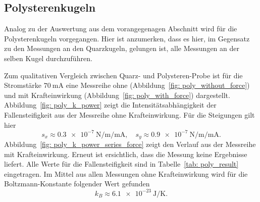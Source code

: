 

\FloatBarrier

\newpage
\subsection{Polysterenkugeln}
Analog zu der Auswertung aus dem vorangegenagen Abschnitt wird für die Polysterenkugeln vorgegangen.
Hier ist anzumerken, dass es hier, im Gegensatz zu den Messungen an den Quarzkugeln, gelungen ist, alle
Messungen an der selben Kugel durchzuführen.

Zum qualitativen Vergleich zwischen Quarz- und Polysteren-Probe ist für die
Stromstärke $\SI{70}{\milli\ampere}$ eine Messreihe ohne (Abbildung~\ref{fig: poly_without_force}) und
mit Krafteinwirkung (Abbildung~\ref{fig: poly_with_force}) dargestellt.
Abbildung~\ref{fig: poly_k_power} zeigt die Intensitätsabhängigkeit der Fallensteifigkeit aus der Messreihe ohne Krafteinwirkung.
Für die Steigungen gilt hier
\begin{equation}
  s_x \approx \SI{0.3e-7}{\newton \per \meter \per \milli\ampere}, \quad s_y \approx \SI{0.9e-7}{\newton \per \meter \per \milli\ampere}.
\end{equation}
Abbildung~\ref{fig: poly_k_power_series_force} zeigt den Verlauf aus der Messreihe mit Krafteinwirkung. Erneut ist ersichtlich, dass die Messung
keine Ergebnisse liefert.
Alle Werte für die Fallensteifigkeit
sind in Tabelle~\ref{tab: poly_result} eingetragen.
Im Mittel aus allen
Messungen ohne Krafteinwirkung wird für die Boltzmann-Konstante folgender Wert gefunden
\begin{equation}
  k_B \approx \SI{6.1e-23}{\joule\per\kelvin}.
\end{equation}
